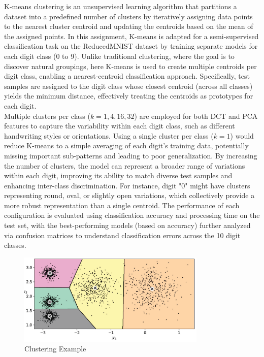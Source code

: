 \documentclass[12pt]{article}
\begin{document}
K-means clustering is an unsupervised learning algorithm that partitions a dataset into a predefined number of clusters by iteratively assigning data points to the nearest cluster centroid and updating the centroids based on the mean of the assigned points. In this assignment, K-means is adapted for a semi-supervised classification task on the ReducedMNIST dataset by training separate models for each digit class (0 to 9). Unlike traditional clustering, where the goal is to discover natural groupings, here K-means is used to create multiple centroids per digit class, enabling a nearest-centroid classification approach. Specifically, test samples are assigned to the digit class whose closest centroid (across all classes) yields the minimum distance, effectively treating the centroids as prototypes for each digit.\\
Multiple clusters per class (\( k = 1, 4, 16, 32 \)) are employed for both DCT and PCA features to capture the variability within each digit class, such as different handwriting styles or orientations. Using a single cluster per class (\( k = 1 \)) would reduce K-means to a simple averaging of each digit's training data, potentially missing important sub-patterns and leading to poor generalization. By increasing the number of clusters, the model can represent a broader range of variations within each digit, improving its ability to match diverse test samples and enhancing inter-class discrimination. For instance, digit "0" might have clusters representing round, oval, or slightly open variations, which collectively provide a more robust representation than a single centroid. The performance of each configuration is evaluated using classification accuracy and processing time on the test set, with the best-performing models (based on accuracy) further analyzed via confusion matrices to understand classification errors across the 10 digit classes.

\begin{figure}[H]
    \centering
    \includegraphics[width=0.8\textwidth]{Kmeans example.png}
    \caption{Clustering Example}
    \label{fig:kmeans_clusters}
\end{figure}
\end{document}
